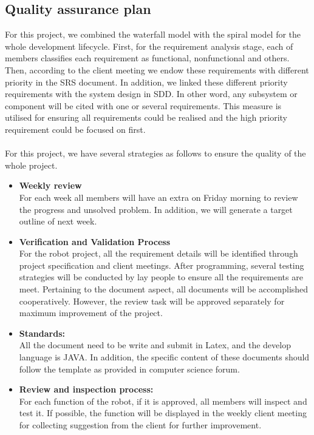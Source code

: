 \documentclass[11pt, a4paper]{article}
\begin{document}
\subsection{Quality assurance plan}
For this project, we combined the waterfall model with the spiral model for the whole development lifecycle. First, for the requirement analysis stage, each of members classifies each requirement as functional, nonfunctional and others. Then, according to the client meeting we endow these requirements with different priority in the SRS document. In addition, we linked these different priority requirements with the system design in SDD. In other word, any subsystem or component will be cited with one or several requirements. This measure is utilised for ensuring all requirements could be realised and the high priority requirement could be focused on first. \\
\\
For this project, we have several strategies as follows to ensure the quality of the whole project.\\

\begin{itemize}
\item {\bfseries Weekly review}\\
For each week all members will have an extra on Friday morning to review the progress and unsolved problem. In addition, we will generate a target outline of next week. \\

\item {\bfseries Verification and Validation Process}\\
For the robot project, all the requirement details will be identified through project specification and client meetings. After programming, several testing strategies will be conducted by lay people to ensure all the requirements are meet. Pertaining to the document aspect, all documents will be accomplished cooperatively. However, the review task will be approved separately for maximum improvement of the project.\\
\item {\bfseries Standards:}\\ 
All the document need to be write and submit in Latex, and the develop language is JAVA. In addition, the specific content of these documents should follow the template as provided in computer science forum.\\

\item {\bfseries Review and inspection process:}\\
For each function of the robot, if it is approved, all members will inspect and test it. If possible, the function will be displayed in the weekly client meeting for collecting suggestion from the client for further improvement.\\
\end{itemize}
\end{document}
